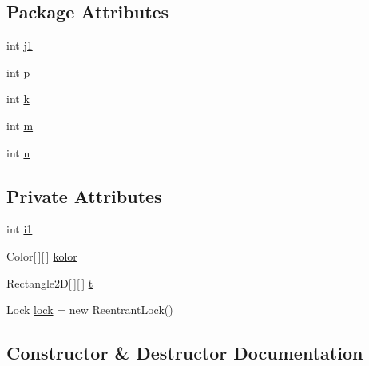 \subsection*{Package Attributes}
\begin{DoxyCompactItemize}
\item 
int \hyperlink{class_zadanie7_1_1_okno_wlasciwe_1_1_watki_wlasciwe_a786ddbb34c817fbc00f1b46dc931f225}{j1}
\item 
int \hyperlink{class_zadanie7_1_1_okno_wlasciwe_1_1_watki_wlasciwe_a22e8786a26cf4b1898ae0d69f4bd01b9}{p}
\item 
int \hyperlink{class_zadanie7_1_1_okno_wlasciwe_1_1_watki_wlasciwe_a6a683092fcf7c93da165c5d0dc13ea01}{k}
\item 
int \hyperlink{class_zadanie7_1_1_okno_wlasciwe_1_1_watki_wlasciwe_a2e0f32af73eb52749d152f59e5278f45}{m}
\item 
int \hyperlink{class_zadanie7_1_1_okno_wlasciwe_1_1_watki_wlasciwe_a1e976e2b4da195c9013b64ed548cd0ca}{n}
\end{DoxyCompactItemize}
\subsection*{Private Attributes}
\begin{DoxyCompactItemize}
\item 
int \hyperlink{class_zadanie7_1_1_okno_wlasciwe_1_1_watki_wlasciwe_a28c612e4cd60226257222d9070a2e9f7}{i1}
\item 
Color\mbox{[}$\,$\mbox{]}\mbox{[}$\,$\mbox{]} \hyperlink{class_zadanie7_1_1_okno_wlasciwe_1_1_watki_wlasciwe_a49a3e6dd42f69b24a442855b7407e51e}{kolor}
\item 
Rectangle2D\mbox{[}$\,$\mbox{]}\mbox{[}$\,$\mbox{]} \hyperlink{class_zadanie7_1_1_okno_wlasciwe_1_1_watki_wlasciwe_ac3435b7920d2703e6dac78ec74ac36d6}{t}
\item 
Lock \hyperlink{class_zadanie7_1_1_okno_wlasciwe_1_1_watki_wlasciwe_a346580729de0ff1e3afbad1301b8e4b1}{lock} = new Reentrant\+Lock()
\end{DoxyCompactItemize}


\subsection{Constructor \& Destructor Documentation}
